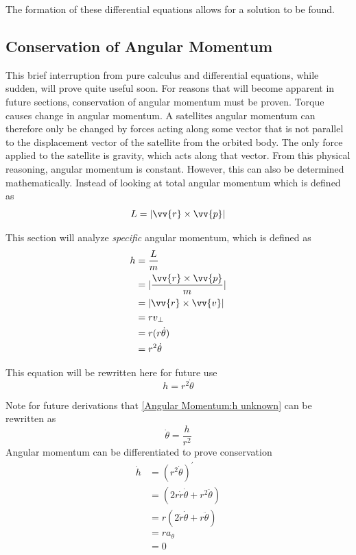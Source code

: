 \documentclass{article}
\begin{document}
The formation of these differential equations allows for a solution to be found.

\bigskip\bigskip
\subsection{Conservation of Angular Momentum}

This brief interruption from pure calculus and differential equations, while sudden, will prove quite useful soon. For reasons that will become apparent in future sections, conservation of angular momentum must be proven. Torque causes change in angular momentum. A satellites angular momentum can therefore only be changed by forces acting along some vector that is not parallel to the displacement vector of the satellite from the orbited body. The only force applied to the satellite is gravity, which acts along that vector. From this physical reasoning, angular momentum is constant. However, this can also be determined mathematically. Instead of looking at total angular momentum which is defined as
$$L=|\vv{r}\times\vv{p}|$$

This section will analyze \textit{specific} angular momentum, which is defined as
\begin{align*}
    h & =\frac{L}{m}                    \\
      & =|\frac{\vv{r}\times\vv{p}}{m}| \\
      & =|\vv{r}\times\vv{v}|           \\
      & =rv_\perp{}                     \\
      & =r(r\dot{\theta})               \\
      & =r^2\dot{\theta}
\end{align*}

This equation will be rewritten here for future use
\begin{equation}\label{Angular Momentum:h unknown}
    h=r^2\dot{\theta}
\end{equation}

Note for future derivations that \eqref{Angular Momentum:h unknown} can be rewritten as
$$\dot{\theta}=\frac{h}{r^2}$$
Angular momentum can be differentiated to prove conservation
\begin{align*}
    \dot{h} & =(r^2\dot{\theta})^\prime                 \\
            & =(2r\dot{r}\dot{\theta}+r^2\ddot{\theta}) \\
            & =r(2\dot{r}\dot{\theta}+r\ddot{\theta})   \\
            & =ra_\theta                                \\
            & =0
\end{align*}
\end{document}
